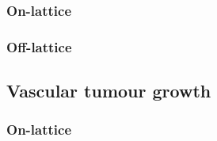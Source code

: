 \documentclass[superscriptaddress, a4paper]{article}
\begin{document}
\subsubsection{On-lattice}
\label{sec:on-lattice avascular tumour spheroid growth}



\subsubsection{Off-lattice}
\label{sec:off-lattice avascular tumour spheroid growth}



\subsection{Vascular tumour growth}
\label{sec:vascular tumour growth}

\subsubsection{On-lattice}
\label{sec:on-lattice vascular tumour growth}
\end{document}
